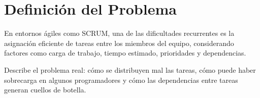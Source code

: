 \section{Definición del Problema}
En entornos ágiles como SCRUM, una de las dificultades recurrentes es la asignación eficiente de tareas entre los miembros del equipo, considerando factores como carga de trabajo, tiempo estimado, prioridades y dependencias.
\vspace{0.5cm}

\begin{tcolorbox}[colback=gray!10, colframe=black!30, title={Sugerencia para esta sección}]
    Describe el problema real: cómo se distribuyen mal las tareas, cómo puede haber sobrecarga en algunos programadores y cómo las dependencias entre tareas generan cuellos de botella.
\end{tcolorbox}
